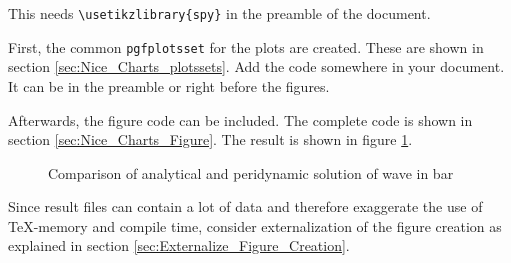
This needs \lstinline[style=inlinetexstyle]+\usetikzlibrary{spy}+ in the preamble of the document.

First, the common \verb+pgfplotsset+ for the plots are created. These are shown in section \ref{sec:Nice_Charts_plotssets}. Add the code somewhere in your document. It can be in the preamble or right before the figures. 

Afterwards, the figure code can be included. The complete code is shown in section \ref{sec:Nice_Charts_Figure}. The result is shown in figure \ref{fig:Chart_Example}.

\begin{figure}[htbp]
\centering
\tikzexternalenable
{}

\tikzexternaldisable
\caption{Comparison of analytical and peridynamic solution of wave in bar}
\label{fig:Chart_Example}
\end{figure}

Since result files can contain a lot of data and therefore exaggerate the use of \TeX{}-memory and compile time, consider externalization of the figure creation as explained in section \ref{sec:Externalize_Figure_Creation}.
